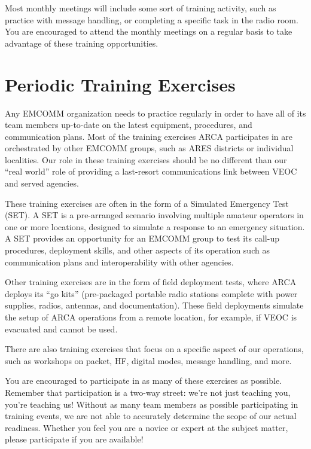 \documentclass[pdflatex,letterpaper,twoside,12pt]{book}
\begin{document}
Most monthly meetings will include some sort of training activity, such as practice with message handling, or completing a specific task in the radio room.  You are encouraged to attend the monthly meetings on a regular basis to take advantage of these training opportunities.


\section{Periodic Training Exercises}

Any EMCOMM organization needs to practice regularly in order to have all of its team members up-to-date on the latest equipment, procedures, and communication plans.  Most of the training exercises ARCA participates in are orchestrated by other EMCOMM groups, such as ARES districts or individual localities.  Our role in these training exercises should be no different than our ``real world'' role of providing a last-resort communications link between VEOC and served agencies.

These training exercises are often in the form of a Simulated Emergency Test (SET).  A SET is a pre-arranged scenario involving multiple amateur operators in one or more locations, designed to simulate a response to an emergency situation.  A SET provides an opportunity for an EMCOMM group to test its call-up procedures, deployment skills, and other aspects of its operation such as communication plans and interoperability with other agencies.

Other training exercises are in the form of field deployment tests, where ARCA deploys its ``go kits'' (pre-packaged portable radio stations complete with power supplies, radios, antennas, and documentation).  These field deployments simulate the setup of ARCA operations from a remote location, for example, if VEOC is evacuated and cannot be used.

There are also training exercises that focus on a specific aspect of our operations, such as workshops on packet, HF, digital modes, message handling, and more.

You are encouraged to participate in as many of these exercises as possible.  Remember that participation is a two-way street:  we're not just teaching you, you're teaching us!  Without as many team members as possible participating in training events, we are not able to accurately determine the scope of our actual readiness.  Whether you feel you are a novice or expert at the subject matter, please participate if you are available!
\end{document}
